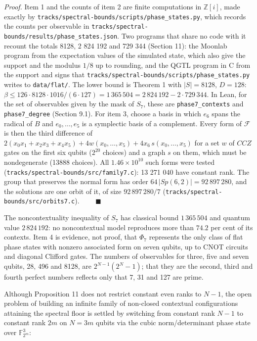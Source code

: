 \documentclass[11pt,a4paper]{article}
\begin{document}
\emph{Proof.} Item 1 and the counts of item 2 are finite computations in \(\mathbb{Z}[i]\), made exactly by
\nolinkurl{tracks/spectral-bounds/scripts/phase_states.py}, which records the counts per observable in \nolinkurl{tracks/spectral-bounds/results/phase_states.json}.
Two programs that share no code with it recount the totals 8128, 2 824 192 and 729 344 (Section 11):
the Moonlab program from the expectation values of the simulated state, which also give the support
and the modulus \(1/8\) up to rounding, and the QGTL program in C from the support and signs that
\nolinkurl{tracks/spectral-bounds/scripts/phase_states.py} writes to \texttt{data/flat/}. The lower bound is Theorem 1 with \(|S| = 8128\), \(D = 128\):
\(\beta \le 126 \cdot 8128 \cdot 1016/(6\cdot 127) = 1\,365\,504 = 2\,824\,192 - 2 \cdot 729\,344\). In Lean, for
the set of observables given by the mask of \(S_7\), these are \texttt{phase7\_contexts} and \texttt{phase7\_degree}
(Section 9.1). For item 3,
choose a basis in which \(e_6\) spans the radical of \(B\) and \(e_0,\dots,e_5\) is a symplectic basis of a
complement. Every form of \(\mathcal{F}\) is then the third difference of
\(2(x_0x_1 + x_2x_3 + x_4x_5) + 4w(x_0,\dots,x_5) + 4x_6\,s(x_0,\dots,x_5)\) for a set \(w\) of \(CCZ\) gates
on the first six qubits (\(2^{20}\) choices) and a graph \(s\) on them, which must be nondegenerate (13888
choices). All \(1.46 \times 10^{10}\) such forms were tested (\texttt{tracks/spectral-bounds/src/family7.c}): 13 271 040 have constant
rank. The group that preserves the normal form has order \(64\,|Sp(6,2)| = 92\,897\,280\), and the
solutions are one orbit of it, of size \(92\,897\,280/7\) (\texttt{tracks/spectral-bounds/src/orbits7.c}). \(\qquad\blacksquare\)

The noncontextuality inequality of \(S_7\) has classical bound \(1\,365\,504\) and quantum value \(2\,824\,192\):
no noncontextual model reproduces more than \(74.2\) per cent of its contexts. Item 4 is evidence, not
proof, that \(\Phi_7\) represents the only class of flat phase states with nonzero associated form on
seven qubits, up to CNOT circuits and diagonal Clifford gates. The numbers of
observables for three, five and seven qubits, 28, 496 and 8128, are \(2^{N-1}(2^N-1)\); that they are the
second, third and fourth perfect numbers reflects only that 7, 31 and 127 are prime.

Although Proposition 11 does not restrict constant even ranks to \(N-1\), the open problem of building an
infinite family of non-closed contextual configurations attaining the spectral floor is settled by
switching from constant rank \(N-1\) to constant rank \(2m\) on \(N=3m\) qubits via the cubic norm/determinant
phase state over \(\mathbb{F}_{2^m}^3\):
\end{document}
